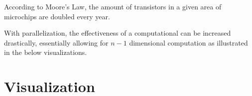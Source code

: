 \documentclass[11pt, a4paper, titlepage]{article}
\begin{document}
According to Moore's Law, the amount of transistors in a given area of microchips are doubled every year. 


With parallelization, the effectiveness of a computational can be increased drastically, essentially allowing for $n-1$ dimensional computation as illustrated in the below visualizations.


\section{Visualization}
\end{document}
